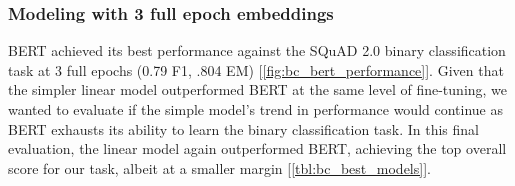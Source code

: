 \subsubsection{Modeling with 3 full epoch embeddings}

BERT achieved its best performance against the SQuAD 2.0 binary classification task at 3 full epochs (0.79 F1, .804 EM) [\ref{fig:bc_bert_performance}].  Given that the simpler linear model outperformed BERT at the same level of fine-tuning, we wanted to evaluate if the simple model’s trend in performance would continue as BERT exhausts its ability to learn the binary classification task.  In this final evaluation, the linear model again outperformed BERT, achieving the top overall score for our task, albeit at a smaller margin [\ref{tbl:bc_best_models}].